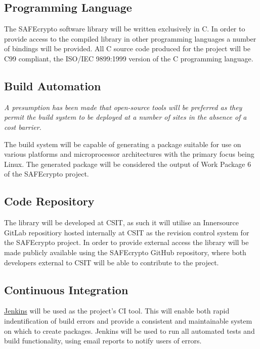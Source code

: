 \subsection{Programming Language}

The SAFEcrypto software library will be written exclusively in C. In order to provide access to the compiled library in other programming languages a number of bindings will be provided. All C source code produced for the project will be C99 compliant, the ISO/IEC 9899:1999 version of the C programming language.


\subsection{Build Automation}

\textit{A presumption has been made that open-source tools will be preferred as they permit the build system to be deployed at a number of sites in the absence of a cost barrier.}

The build system will be capable of generating a package suitable for use on various platforms and microprocessor architectures with the primary focus being Linux. The generated package will be considered the output of Work Package 6 of the SAFEcrypto project.


\subsection{Code Repository}

The library will be developed at CSIT, as such it will utilise an Innersource GitLab repositiory hosted internally at CSIT as the revision control system for the SAFEcrypto project. In order to provide external access the library will be made publicly available using the SAFEcrypto GitHub repository, where both developers external to CSIT will be able to contribute to the project.


\subsection{Continuous Integration}

\href{https://jenkins.io/}{Jenkins} will be used as the project's CI tool. This will enable both rapid indentification of build errors and provide a consistent and maintainable system on which to create packages. Jenkins will be used to run all automated tests and build functionality, using email reports to notify users of errors.


